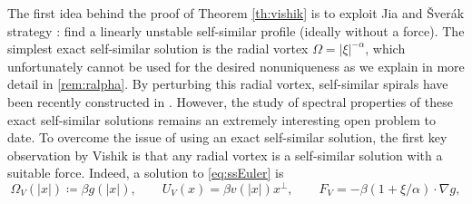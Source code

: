 \documentclass[11pt,reqno]{amsproc}
\newcommand{\red}[1]{\textcolor{red}{#1}}
\def\RR {\mathbb{R}}
\theoremstyle{definition}
\newtheorem{remark}[proposition]{Remark}
\theoremstyle{definition}
\numberwithin{equation}{section}
\begin{document}
The first idea behind the proof of Theorem \ref{th:vishik} is to exploit Jia and \v{S}ver\'{a}k strategy \cite{jia2015incompressible}: find a linearly unstable self-similar profile (ideally without a force). The simplest exact self-similar solution is the radial vortex $\Omega=|\xi|^{-\alpha}$, which unfortunately cannot be used for the desired nonuniqueness as we explain in more detail in \cref{rem:ralpha}. By perturbing this radial vortex, self-similar spirals have been recently constructed in \cite{elling12spiral,elling16spiral,shao2023self}. However, the study of spectral properties of these exact self-similar solutions remains an extremely interesting open problem to date.
To overcome the issue of using an exact self-similar solution, the first key observation by Vishik is that any radial vortex is a self-similar solution with a suitable force. Indeed, a solution to \cref{eq:ssEuler} is 
\begin{equation}
    \label{eq:VishikVortex}
\Omega_V(|x|)\coloneqq\beta g(|x|), \qquad U_V(x)=\beta v(|x|)x^\perp,\qquad F_V=-\beta(1+\xi/\alpha)\cdot \nabla g,
\end{equation}
\end{document}
